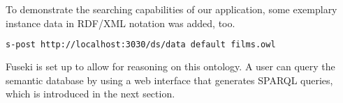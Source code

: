 To demonstrate the searching capabilities of our application, some exemplary instance data in RDF/XML notation was added, too.
\begin{lstlisting}[language=bash]
s-post http://localhost:3030/ds/data default films.owl
\end{lstlisting}

Fuseki is set up to allow for reasoning on this ontology. \cite{reasoning} A user can query the semantic database by using a web interface that generates SPARQL queries, which is introduced in the next section.
